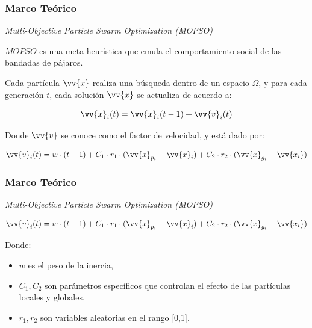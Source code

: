 \documentclass[usenames,dvipsnames]{beamer}
\begin{document}
\begin{frame}
\frametitle{Marco Teórico} 
\begin{exampleblock}{\textit{Multi-Objective Particle Swarm Optimization (MOPSO)}}

$MOPSO$ es una meta-heurística que emula el comportamiento social de las bandadas de pájaros.

Cada partícula $\vv{x}$ realiza una búsqueda dentro de un espacio $\Omega$, y para cada generación $t$, cada solución $\vv{x}$ se actualiza de acuerdo a:

\begin{equation}\label{eq:posicion1}
\vv{x}_i(t) = \vv{x}_i(t-1) + \vv{v}_i(t)
\end{equation}

Donde $\vv{v}$ se conoce como el factor de velocidad, y está dado por:

\begin{equation}\label{eq:velocidad1}
\vv{v}_i(t) = w \cdot (t-1) + C_1 \cdot r_1 \cdot (\vv{x}_{p_i} - \vv{x}_i) + C_2 \cdot r_2 \cdot (\vv{x}_{g_i} - \vv{x_i})
\end{equation}

\end{exampleblock}


\end{frame}

\begin{frame}
\frametitle{Marco Teórico} 
\begin{exampleblock}{\textit{Multi-Objective Particle Swarm Optimization (MOPSO)}}

\begin{equation}\label{eq:velocidad1}
\vv{v}_i(t) = w \cdot (t-1) + C_1 \cdot r_1 \cdot (\vv{x}_{p_i} - \vv{x}_i) + C_2 \cdot r_2 \cdot (\vv{x}_{g_i} - \vv{x_i})
\end{equation}


Donde:

\begin{itemize}
\item $w$ es el peso de la inercia,
\item $C_1,C_2$ son parámetros específicos que controlan el efecto de las partículas locales y globales,
\item $r_1,r_2$ son variables aleatorias en el rango [0,1].
\end{itemize}


\end{exampleblock}


\end{frame}
\end{document}
